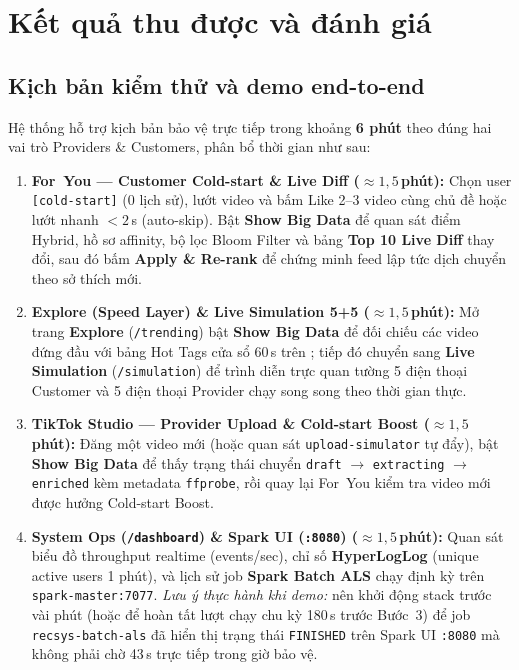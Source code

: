 \chapter{Kết quả thu được và đánh giá}

\section{Kịch bản kiểm thử và demo end-to-end}

Hệ thống hỗ trợ kịch bản bảo vệ trực tiếp trong khoảng \textbf{6 phút} theo đúng hai vai trò Providers \& Customers, phân bổ thời gian như sau:

\begin{enumerate}
  \item \textbf{For~You --- Customer Cold-start \& Live Diff ($\approx 1{,}5$\,phút):} Chọn user \texttt{[cold-start]} (0 lịch sử), lướt video và bấm Like 2--3 video cùng chủ đề hoặc lướt nhanh $<2$\,s (auto-skip). Bật \textbf{Show Big Data} để quan sát điểm Hybrid, hồ sơ affinity, bộ lọc Bloom Filter và bảng \textbf{Top 10 Live Diff} thay đổi, sau đó bấm \textbf{Apply \& Re-rank} để chứng minh feed lập tức dịch chuyển theo sở thích mới.
  \item \textbf{Explore (Speed Layer) \& Live Simulation 5+5 ($\approx 1{,}5$\,phút):} Mở trang \textbf{Explore} (\texttt{/trending}) bật \textbf{Show Big Data} để đối chiếu các video đứng đầu với bảng Hot Tags cửa sổ 60\,s trên ; tiếp đó chuyển sang \textbf{Live Simulation} (\texttt{/simulation}) để trình diễn trực quan tường 5 điện thoại Customer và 5 điện thoại Provider chạy song song theo thời gian thực.
  \item \textbf{TikTok Studio --- Provider Upload \& Cold-start Boost ($\approx 1{,}5$\,phút):} Đăng một video mới (hoặc quan sát \texttt{upload-simulator} tự đẩy), bật \textbf{Show Big Data} để thấy trạng thái chuyển \texttt{draft} $\rightarrow$ \texttt{extracting} $\rightarrow$ \texttt{enriched} kèm metadata \texttt{ffprobe}, rồi quay lại For~You kiểm tra video mới được hưởng Cold-start Boost.
  \item \textbf{System Ops (\texttt{/dashboard}) \& Spark UI (\texttt{:8080}) ($\approx 1{,}5$\,phút):} Quan sát biểu đồ throughput realtime (events/sec), chỉ số \textbf{HyperLogLog} (unique active users 1 phút), và lịch sử job \textbf{Spark Batch ALS} chạy định kỳ trên \texttt{spark-master:7077}. \textit{Lưu ý thực hành khi demo:} nên khởi động stack trước vài phút (hoặc để  hoàn tất lượt chạy chu kỳ 180\,s trước Bước~3) để job \texttt{recsys-batch-als} đã hiển thị trạng thái \texttt{FINISHED} trên Spark UI \texttt{:8080} mà không phải chờ 43\,s trực tiếp trong giờ bảo vệ.
\end{enumerate}

